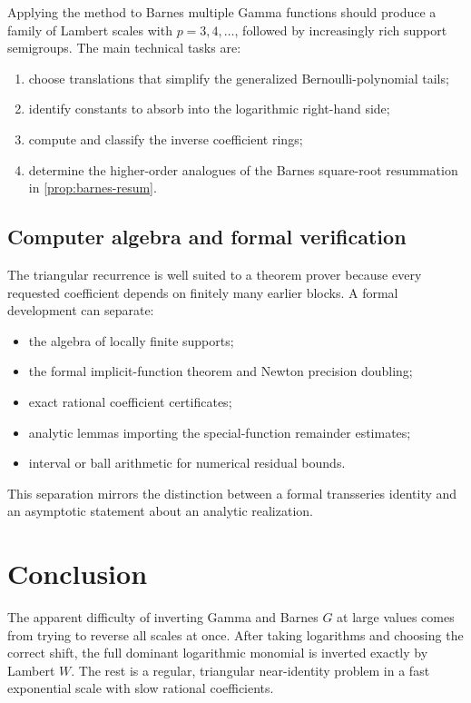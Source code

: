 \documentclass[11pt]{article}
\theoremstyle{definition}
\theoremstyle{remark}
\begin{document}
Applying the method to Barnes multiple Gamma functions should produce a family of Lambert scales with \(p=3,4,\ldots\), followed by increasingly rich support semigroups.  The main technical tasks are:

\begin{enumerate}
\item choose translations that simplify the generalized Bernoulli-polynomial tails;
\item identify constants to absorb into the logarithmic right-hand side;
\item compute and classify the inverse coefficient rings;
\item determine the higher-order analogues of the Barnes square-root resummation in \cref{prop:barnes-resum}.
\end{enumerate}

\subsection{Computer algebra and formal verification}

The triangular recurrence is well suited to a theorem prover because every requested coefficient depends on finitely many earlier blocks.  A formal development can separate:

\begin{itemize}
\item the algebra of locally finite supports;
\item the formal implicit-function theorem and Newton precision doubling;
\item exact rational coefficient certificates;
\item analytic lemmas importing the special-function remainder estimates;
\item interval or ball arithmetic for numerical residual bounds.
\end{itemize}

This separation mirrors the distinction between a formal transseries identity and an asymptotic statement about an analytic realization.

\section{Conclusion}

The apparent difficulty of inverting Gamma and Barnes \(G\) at large values comes from trying to reverse all scales at once.  After taking logarithms and choosing the correct shift, the full dominant logarithmic monomial is inverted exactly by Lambert \(W\).  The rest is a regular, triangular near-identity problem in a fast exponential scale with slow rational coefficients.
\end{document}
